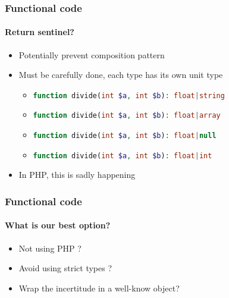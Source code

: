 \begin{frame}
    \frametitle{Functional code}
    \framesubtitle{Return sentinel?}

    \begin{itemize}[<+->]
        \item Potentially prevent composition pattern
        \item Must be carefully done, each type has its own unit type
        \begin{itemize}[<+->]
            \item \lstinline[language=PHP]!function divide(int $a, int $b): float|string!
            \item \lstinline[language=PHP]!function divide(int $a, int $b): float|array!
            \item \lstinline[language=PHP]!function divide(int $a, int $b): float|null!
            \item \lstinline[language=PHP]!function divide(int $a, int $b): float|int!
        \end{itemize}
        \item In PHP, this is sadly happening
    \end{itemize}

\end{frame}

\begin{frame}
    \frametitle{Functional code}
    \framesubtitle{What is our best option?}

    \begin{itemize}[<+->]
        \item Not using PHP ?
        \item Avoid using strict types ?
        \item Wrap the incertitude in a well-know object?
    \end{itemize}

\end{frame}

